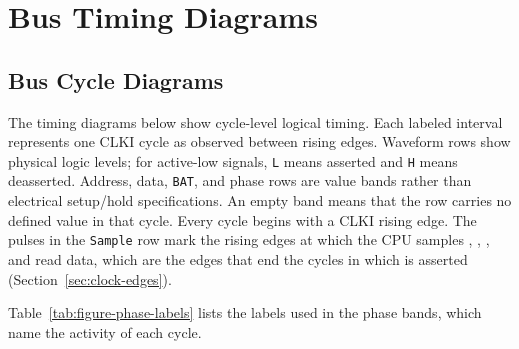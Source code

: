 \chapter{Bus Timing Diagrams}
\label{ch:bus-timing}

\section{Bus Cycle Diagrams}

The timing diagrams below show cycle-level logical timing. Each labeled interval represents one CLKI cycle as observed
between rising edges. Waveform rows show physical logic levels; for active-low signals, \texttt{L} means asserted and
\texttt{H} means deasserted. Address, data, \texttt{BAT}, and phase rows are value bands rather than electrical
setup/hold specifications. An empty band means that the row carries no defined value in that cycle. Every cycle begins
with a CLKI rising edge. The pulses in the \texttt{Sample} row mark the rising edges at which the CPU samples
, , , and read data, which are the edges that end the cycles in which
 is asserted (Section~\ref{sec:clock-edges}).

Table~\ref{tab:figure-phase-labels} lists the labels used in the phase bands, which name the activity of each cycle.

